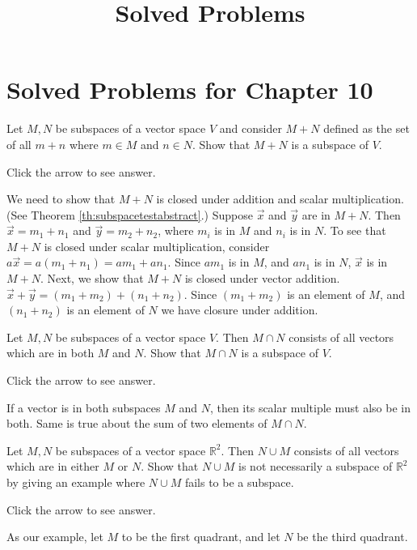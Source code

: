 \documentclass{ximera}
\title{Solved Problems} \license{CC BY-NC-SA 4.0}
\begin{document}
\begin{abstract}
\end{abstract}
\maketitle

\section*{Solved Problems for Chapter 10}

\begin{problem}\label{prb:10.17} Let $M,N$ be subspaces of a vector space $V$ and consider $M+N$
defined as the set of all $m+n$ where $m\in M$ and $n\in N$. Show that $M+N$
is a subspace of $V$.

Click the arrow to see answer.
\begin{expandable}
    We need to show that $M+N$ is closed under addition and scalar multiplication. 
 (See Theorem \ref{th:subspacetestabstract}.)  Suppose $\vec{x}$ and $\vec{y}$ are in $M+N$.  Then $\vec{x}=m_1+n_1$ and $\vec{y}=m_2+n_2$, where $m_i$ is in $M$ and $n_i$ is in $N$.  To see that $M+N$ is closed under scalar multiplication, consider $a\vec{x}=a(m_1+n_1)=am_1+an_1$.  Since $am_1$ is in $M$, and $an_1$ is in $N$, $\vec{x}$ is in $M+N$.  Next, we show that $M+N$ is closed under vector addition. $\vec{x}+\vec{y}=(m_1+m_2)+(n_1+n_2)$.  Since $(m_1+m_2)$ is an element of $M$, and $(n_1+n_2)$ is an element of $N$ we have closure under addition.
\end{expandable}
\end{problem}

\begin{problem}\label{prb:10.18} Let $M,N$ be subspaces of a vector space $V$. Then $M\cap N$ consists
of all vectors which are in both $M$ and $N$. Show that $M\cap N$ is a
subspace of $V$.

Click the arrow to see answer.
\begin{expandable}
    If a vector is in both subspaces $M$ and $N$, then its scalar multiple must also be in both.  Same is true about the sum of two elements of $M\cap N$.
\end{expandable}
\end{problem}

\begin{problem}\label{prb:10.19} Let $M,N$ be subspaces of a vector space $\mathbb{R}^{2}.$ Then $N\cup
M$ consists of all vectors which are in either $M$ or $N$. Show that $N\cup
M $ is not necessarily a subspace of $\mathbb{R}^{2}$ by giving an example
where $N\cup M$ fails to be a subspace.

Click the arrow to see answer.
\begin{expandable}
    As our example, let $M$ to be the first quadrant, and let $N$ be the third quadrant.
\end{expandable}
\end{problem}
\end{document}
